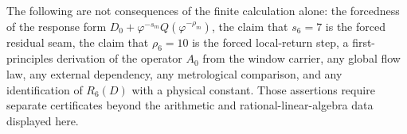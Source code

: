 The following are not consequences of the finite calculation alone: the forcedness of the response form $D_0+\varphi^{-s_m}Q(\varphi^{-\rho_m})$, the claim that $s_6=7$ is the forced residual seam, the claim that $\rho_6=10$ is the forced local-return step, a first-principles derivation of the operator $A_0$ from the window carrier, any global flow law, any external dependency, any metrological comparison, and any identification of $R_6(D)$ with a physical constant. Those assertions require separate certificates beyond the arithmetic and rational-linear-algebra data displayed here.
